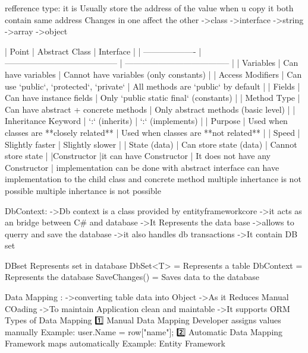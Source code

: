 refference type:
                it is Usually store the address of the value
                when u copy it both contain same address
                Changes in one affect the other
                ->class
                ->interface
                ->string
                ->array
                ->object
                    

| Point               | Abstract Class                            | Interface                              |
| ------------------- | ----------------------------------------- | -------------------------------------- |
| Variables           | Can have variables                        | Cannot have variables (only constants) |
| Access Modifiers    | Can use `public`, `protected`, `private`  | All methods are `public` by default    |
| Fields              | Can have instance fields                  | Only `public static final` (constants) |
| Method Type         | Can have abstract + concrete methods      | Only abstract methods (basic level)    |
| Inheritance Keyword | `:` (inherits)                            | `:` (implements)                       |
| Purpose             | Used when classes are **closely related** | Used when classes are **not related**  |
| Speed               | Slightly faster                           | Slightly slower                        |
| State (data)        | Can store state (data)                    | Cannot store state                     |
|Constructor          |it can have Constructor                    | It does not have any Constructor
|                      implementation can be done with abstract     interface can have implementation to the child class
                        and concrete method   
                        multiple inhertance is not possible             multiple inhertance is not possible     
                        
                        
DbContext:
        ->Db context is a class provided by entityframeworkcore
        ->it acts as an bridge between C# and database
        ->It Represents the data base
        ->allows to querry and save the database
        ->it also handles db transactions 
        ->It contain DB set

DBset Represents set in database
DbSet<T> = Represents a table
DbContext = Represents the database
SaveChanges() = Saves data to the database

Data Mapping :
        ->converting table data into Object
        ->As it Reduces Manual COading
        ->To maintain Application clean and maintable
        ->It supports ORM
        Types of Data Mapping
1️⃣ Manual Data Mapping
        Developer assigns values manually
        Example: user.Name = row["name"];
2️⃣ Automatic Data Mapping
        Framework maps automatically
        Example: Entity Framework

